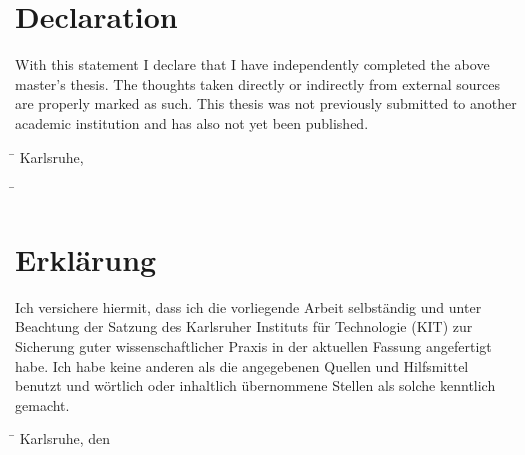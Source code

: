 \ifx\theThesisLanguage\dictThesisLanguageEnglish

\chapter*{Declaration}

With this statement I declare that I have independently completed the above
master's thesis. The thoughts taken directly or indirectly from external
sources are properly marked as such. This thesis was not previously submitted
to another academic institution and has also not yet been published.

\vspace{2cm}
\begin{tabbing}
\hspace{3em}\= \kill
\>Karlsruhe, \theThesisSignatureDate
\end{tabbing}

\vspace{2cm}
\begin{tabbing}
\hspace{3em}\= \kill
\>\theThesisAuthor\\[1ex]
\end{tabbing}

\else

\chapter*{Erkl{\"a}rung}


Ich versichere hiermit,
dass ich die vorliegende Arbeit selbst{\"a}ndig
und unter Beachtung der Satzung des Karlsruher Instituts f\"ur Technologie (KIT)
zur Sicherung guter wissen\-schaft\-licher Praxis in der aktuellen Fassung angefertigt habe.
Ich habe keine anderen als die angegebenen Quellen und Hilfsmittel benutzt und w{\"o}rtlich oder inhaltlich {\"u}bernommene Stellen als solche kenntlich gemacht.

\vspace{2cm}
\begin{tabbing}
\hspace{3em}\= \kill
\>Karlsruhe, den \theThesisSignatureDate
\end{tabbing}

